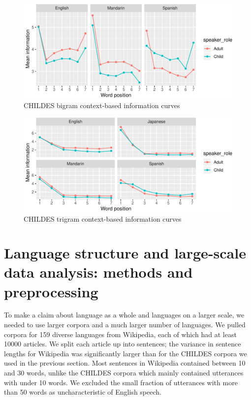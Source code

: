 \documentclass[11pt,]{article}
\begin{document}
\begin{figure}
\centering
\includegraphics{paper_files/figure-latex/unnamed-chunk-5-1.pdf}
\caption{\label{fig:unnamed-chunk-5}CHILDES bigram context-based information curves}
\end{figure}

\begin{figure}
\centering
\includegraphics{paper_files/figure-latex/unnamed-chunk-6-1.pdf}
\caption{\label{fig:unnamed-chunk-6}CHILDES trigram context-based information curves}
\end{figure}

\hypertarget{language-structure-and-large-scale-data-analysis-methods-and-preprocessing}{%
\section{Language structure and large-scale data analysis: methods and preprocessing}\label{language-structure-and-large-scale-data-analysis-methods-and-preprocessing}}

To make a claim about language as a whole and languages on a larger scale, we needed to use larger corpora and a much larger number of languages. We pulled corpora for 159 diverse languages from Wikipedia, each of which had at least 10000 articles. We split each article up into sentences; the variance in sentence lengths for Wikipedia was significantly larger than for the CHILDES corpora we used in the previous section. Most sentences in Wikipedia contained between 10 and 30 words, unlike the CHILDES corpora which mainly contained utterances with under 10 words. We excluded the small fraction of utterances with more than 50 words as uncharacteristic of English speech.
\end{document}
